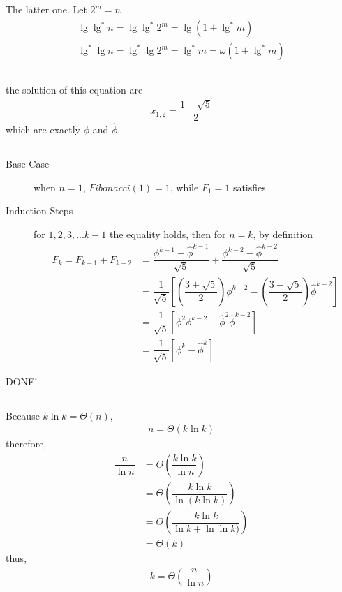 \documentclass[paper=a4, fontsize=11pt,oneside]{book} %
\numberwithin{equation}{section} %
\numberwithin{figure}{section} %
\numberwithin{table}{section} %
\begin{document}
	\subsection{}
		The latter one. Let $2^m = n$
		\begin{align*}
		\lg \lg^*n = \lg \lg^*2^m = \lg(1 + \lg^*m ) \\
		\lg^*\lg n = \lg^*\lg 2^m = \lg^*m = \omega(1 + \lg^*m)
		\end{align*}
	\subsection{}
		the solution of this equation are
		\begin{align*}
		x_{1,2} = \dfrac{1 \pm \sqrt{5}}{2}
		\end{align*}
		which are exactly $\phi $ and $ \hat{\phi}$.
		
	\subsection{}
		\begin{description}
			\item[Base Case] when $n = 1$, $Fibonacci(1) = 1$, while $F_1 = 1$ satisfies.
			\item[Induction Steps] for $1,2,3,...k-1$ the equality holds,
			then for $n = k$, by definition
			\begin{align*}
			F_k = F_{k-1} + F_{k-2} &= \dfrac{\phi^{k-1}-\hat{\phi}^{k-1}}{\sqrt{5}} +
												 \dfrac{\phi^{k-2}-\hat{\phi}^{k-2}}{\sqrt{5}}\\
											&= \dfrac{1}{\sqrt{5}}[(\dfrac{3 + \sqrt{5}}{2})\phi^{k-2}- 
													(\dfrac{3-\sqrt{5}}{2})\hat{\phi}^{k-2}] \\
										&= \dfrac{1}{\sqrt{5}}[\phi^2\phi^{k-2}- 
										\hat{\phi}^2\hat{\phi}^{k-2}] \\
										&= \dfrac{1}{\sqrt{5}}[\phi^{k}- 
										\hat{\phi}^{k}] 
			\end{align*} 
		\end{description}
					DONE!
		
		\subsection{}
		Because $k\ln k = \Theta(n)$,
		\begin{align*}
			n = \Theta(k\ln k)
		\end{align*}
		therefore,
		\begin{align*}
		\dfrac{n}{\ln n} &= \Theta(\dfrac{k\ln k}{\ln n}) \\
		&= \Theta(\dfrac{k\ln k}{\ln (k\ln k)})\\
		&= \Theta(\dfrac{k\ln k}{\ln k + \ln\ln k)})\\	
		&= \Theta(k) 
		\end{align*}
		thus,
		\begin{align*}
		k = \Theta(\dfrac{n}{\ln n})
		\end{align*}
		
\end{document}
